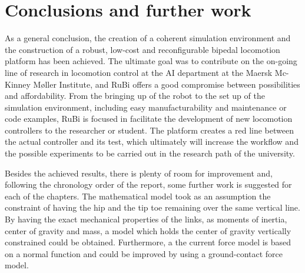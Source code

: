 \chapter{Conclusions and further work} %
\label{cha:conclusions}
As a general conclusion, the creation of a coherent simulation environment and the construction of a robust, low-cost and reconfigurable bipedal locomotion platform has been achieved.
The ultimate goal was to contribute on the on-going line of research in locomotion control at the AI department at the Maersk Mc-Kinney Møller Institute, and RuBi offers a good compromise between possibilities and affordability.
From the bringing up of the robot to the set up of the simulation environment,  including easy manufacturability and maintenance or code examples, RuBi is focused in facilitate the development of new locomotion controllers to the researcher or student.
The platform creates a red line between the actual controller and its test, which ultimately will increase the workflow and the possible experiments to be carried out in the research path of the university.




Besides the achieved results, there is plenty of room for improvement and, following the chronology order of the report, some further work is suggested for each of the chapters.
The mathematical model took as an assumption the constraint of having the hip and the tip toe remaining over the same vertical line.
By having the exact mechanical properties of the links, as moments of inertia, center of gravity and mass, a model which holds the center of gravity vertically constrained could be obtained.
Furthermore, a the current force model  is based on a normal function and could be improved by using a ground-contact force model.

